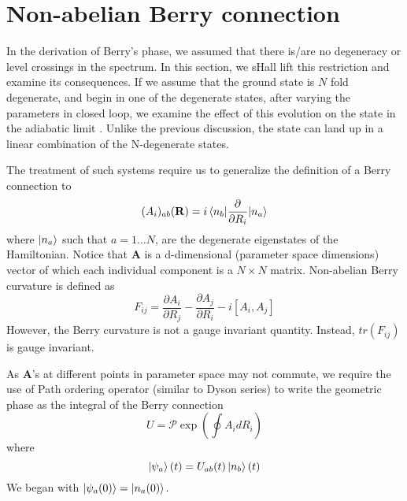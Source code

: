 \section{Non-abelian Berry connection}
In the derivation of Berry's phase, we assumed that there is/are no degeneracy or level crossings in the spectrum. In this section, we sHall lift this restriction and examine its
consequences. If we assume that the ground state is $N$ fold degenerate, and begin in one of the degenerate states, after varying the parameters in closed loop, we examine the effect 
of this evolution on the state in the adiabatic limit \cite{wilczek1984appearance}. Unlike the previous discussion, the state can land up in a linear combination of the N-degenerate states.

The treatment of such systems require us to generalize the definition of a Berry connection to
\begin{equation}
 (A_{i})_{ab}(\mathbf{R}) = i \braket{n_{b} | \frac{\partial}{\partial R_{i}} | n_{a}}
\end{equation} where $\ket{n_{a}}$ such that $a=1\dots N$, are the degenerate eigenstates of the Hamiltonian. Notice that $\mathbf{A}$ is a d-dimensional (parameter space dimensions) vector of which
each individual component is a $N \times N$ matrix. 
Non-abelian Berry curvature is defined as 
\begin{equation}
 F_{ij} = \frac{\partial A_{i}}{\partial R_{j}} - \frac{\partial A_{j}}{\partial R_{i}} - i[A_{i}, A_{j}]
\end{equation} However, the Berry curvature is not a gauge invariant quantity. Instead, $tr(F_{ij})$ is gauge invariant.

As $\mathbf{A}$'s at different points in parameter space may not commute, we require the use of Path ordering operator (similar to Dyson series) to write the geometric phase 
as the integral of the Berry connection
\begin{equation}
 U = \mathcal{P}\exp\left(\oint A_{i}dR_{i}\right)
\end{equation}
where \begin{equation}
       \ket{\psi_{a}}(t) = U_{ab}(t) \ket{n_{b}}(t)
      \end{equation}
We began with $\ket{\psi_{a}(0)} = \ket{n_{a}(0)}$.

